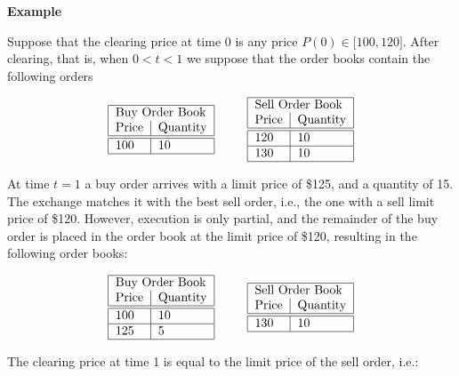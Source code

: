 \documentclass{article}
\begin{document}
\textbf{Example}

Suppose that the clearing price at time $0$ is any price $P(0)\in \lbrack
100,120]$. After clearing, that is, when $0<t<1$ we suppose that the order
books contain the following orders

\begin{equation*}
\begin{tabular}{|l|l|}
\hline
\multicolumn{2}{|l|}{Buy Order Book} \\ 
Price & Quantity \\ \hline\hline
100 & 10 \\ \hline
\end{tabular}%
\text{ \ \ \ \ \ }%
\begin{tabular}{|l|l|}
\hline
\multicolumn{2}{|l|}{Sell Order Book} \\ 
Price & Quantity \\ \hline\hline
120 & 10 \\ \hline
130 & 10 \\ \hline
\end{tabular}%
\end{equation*}

At time $t=1$ a buy order arrives with a limit price of \$125, and a
quantity of 15. The exchange matches it with the best sell order, i.e., the
one with a sell limit price of \$120. However, execution is only partial,
and the remainder of the buy order is placed in the order book at the limit
price of \$120, resulting in the following order books:

\begin{equation*}
\begin{tabular}{|l|l|}
\hline
\multicolumn{2}{|l|}{Buy Order Book} \\ 
Price & Quantity \\ \hline\hline
100 & 10 \\ \hline
125 & 5 \\ \hline
\end{tabular}%
\text{ \ \ \ \ \ }%
\begin{tabular}{|l|l|}
\hline
\multicolumn{2}{|l|}{Sell Order Book} \\ 
Price & Quantity \\ \hline\hline
130 & 10 \\ \hline
\end{tabular}%
\end{equation*}

The clearing price at time 1 is equal to the limit price of the sell order,
i.e.:
\end{document}
